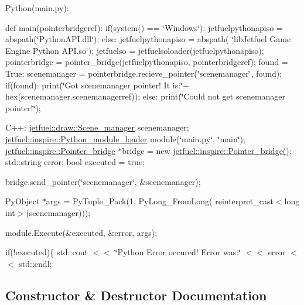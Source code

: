 Python(main.\+py)\+:

def main(pointerbridgeref)\+: if(system() == \char`\"{}\+Windows\char`\"{})\+: jetfuelpythonapiso = abspath(\char`\"{}\+Python\+A\+P\+I.\+dll\char`\"{}); else\+: jetfuelpythonapiso = abspath( \char`\"{}lib\+Jetfuel Game Engine Python A\+P\+I.\+so\char`\"{}); jetfuelso = jetfuelsoloader(jetfuelpythonapiso); pointerbridge = pointer\+\_\+bridge(jetfuelpythonapiso, pointerbridgeref); found = True; scenemanager = pointerbridge.\+recieve\+\_\+pointer(\char`\"{}scenemanager\char`\"{}, found); if(found)\+: print(\char`\"{}\+Got scenemanager pointer! It is\+:\char`\"{}+ hex(scenemanager.\+scenemanagerref)); else\+: print(\char`\"{}\+Could not get scenemanager pointer!\char`\"{});

C++\+: \hyperlink{classjetfuel_1_1draw_1_1Scene__manager}{jetfuel\+::draw\+::\+Scene\+\_\+manager} scenemanager; \hyperlink{classjetfuel_1_1inspire_1_1Python__module__loader}{jetfuel\+::inspire\+::\+Python\+\_\+module\+\_\+loader} module(\char`\"{}main.\+py\char`\"{}, \char`\"{}main\char`\"{}); \hyperlink{classjetfuel_1_1inspire_1_1Pointer__bridge}{jetfuel\+::inspire\+::\+Pointer\+\_\+bridge} $\ast$bridge = new \hyperlink{classjetfuel_1_1inspire_1_1Pointer__bridge}{jetfuel\+::inspire\+::\+Pointer\+\_\+bridge()}; std\+::string error; bool executed = true;

bridge.\+send\+\_\+pointer(\char`\"{}scenemanager\char`\"{}, \&scenemanager);

Py\+Object $\ast$args = Py\+Tuple\+\_\+\+Pack(1, Py\+Long\+\_\+\+From\+Long( reinterpret\+\_\+cast$<$long int$>$(scenemanager)));

module.\+Execute(\&executed, \&error, args);

if(!executed)\{ std\+::cout $<$$<$ \char`\"{}\+Python Error occured! Error was\+:\char`\"{} $<$$<$ error $<$$<$ std\+::endl; 

\subsection{Constructor \& Destructor Documentation}
\mbox{\label{classjetfuel_1_1inspire_1_1Pointer__bridge_a8b799f891596d70d98ee577ef87a6781}} 
